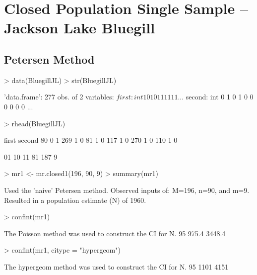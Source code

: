 \documentclass[a4paper]{article}
\begin{document}
\section{Closed Population Single Sample -- Jackson Lake Bluegill}
\subsection{Petersen Method}
\begin{Schunk}
\begin{Sinput}
> data(BluegillJL)
> str(BluegillJL)
\end{Sinput}
\begin{Soutput}
'data.frame':	277 obs. of  2 variables:
 $ first : int  1 0 1 0 1 1 1 1 1 1 ...
 $ second: int  0 1 0 1 0 0 0 0 0 0 ...
\end{Soutput}
\begin{Sinput}
> rhead(BluegillJL)
\end{Sinput}
\begin{Soutput}
    first second
80      0      1
269     1      0
81      1      0
117     1      0
270     1      0
110     1      0
\end{Soutput}
\begin{Soutput}
 01  10  11
 81 187   9
\end{Soutput}
\begin{Sinput}
> mr1 <- mr.closed1(196, 90, 9)
> summary(mr1)
\end{Sinput}
\begin{Soutput}
Used the 'naive' Petersen method.
Observed inputs of: M=196, n=90, and m=9.
Resulted in a population estimate (N) of 1960.
\end{Soutput}
\begin{Sinput}
> confint(mr1)
\end{Sinput}
\begin{Soutput}
The Poisson method was used to construct the CI for N.
 95% LCI 95% UCI
   975.4  3448.4
\end{Soutput}
\begin{Sinput}
> confint(mr1, citype = "hypergeom")
\end{Sinput}
\begin{Soutput}
The hypergeom method was used to construct the CI for N.
 95% LCI 95% UCI
    1101    4151
\end{Soutput}
\end{Schunk}
\end{document}
